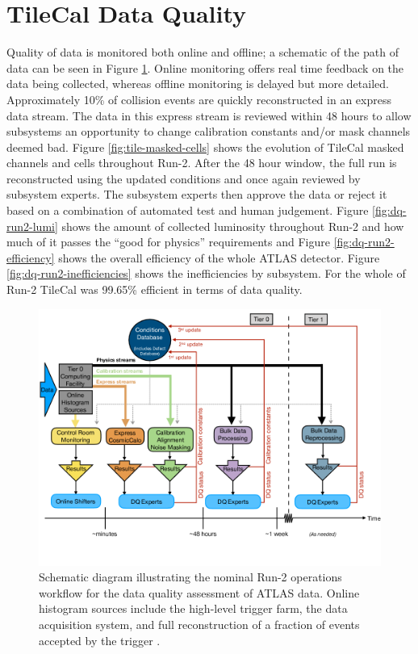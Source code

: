 	\section{TileCal Data Quality}
		Quality of data is monitored both online and offline; a schematic of the path of data can be seen in Figure \ref{fig:dq-data-flow}. Online monitoring offers real time feedback on the data being collected, whereas offline monitoring is delayed but more detailed. Approximately 10\% of collision events are quickly reconstructed in an express data stream. The data in this express stream is reviewed within 48 hours to allow subsystems an opportunity to change calibration constants and/or mask channels deemed bad. Figure \ref{fig:tile-masked-cells} shows the evolution of \gls{TileCal} masked channels and cells throughout Run-2. After the 48 hour window, the full run is reconstructed using the updated conditions and once again reviewed by subsystem experts. The subsystem experts then approve the data or reject it based on a combination of automated test and human judgement. Figure \ref{fig:dq-run2-lumi} shows the amount of collected luminosity throughout Run-2 and how much of it passes the ``good for physics'' requirements and Figure \ref{fig:dq-run2-efficiency} shows the overall efficiency of the whole ATLAS detector. Figure \ref{fig:dq-run2-inefficiencies} shows the inefficiencies by subsystem. For the whole of Run-2 \gls{TileCal} was 99.65\% efficient in terms of data quality.

		\begin{figure}
			\centering
			\includegraphics[width=.75\textwidth,keepaspectratio=true]{appendices/images/DQ_Data_Flow_Diagram.png}
			\caption{\label{fig:dq-data-flow} Schematic diagram illustrating the nominal Run-2 operations workflow for the data quality assessment of ATLAS data. Online histogram sources include the high-level trigger farm, the data acquisition system, and full reconstruction of a fraction of events accepted by the trigger \cite{DQ-Run2}.}
		\end{figure}


